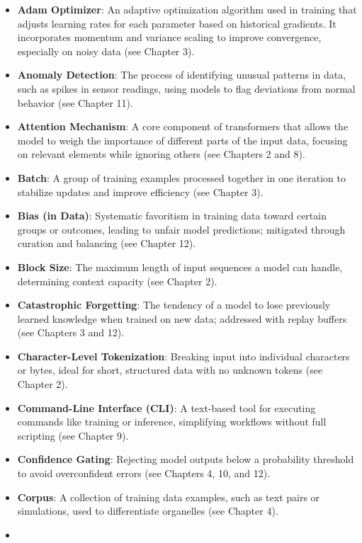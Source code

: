 \documentclass[
]{article}
\begin{document}
\begin{itemize}
\item
  \textbf{Adam Optimizer}: An adaptive optimization algorithm used in
  training that adjusts learning rates for each parameter based on
  historical gradients. It incorporates momentum and variance scaling to
  improve convergence, especially on noisy data (see Chapter 3).
\item
  \textbf{Anomaly Detection}: The process of identifying unusual
  patterns in data, such as spikes in sensor readings, using models to
  flag deviations from normal behavior (see Chapter 11).
\item
  \textbf{Attention Mechanism}: A core component of transformers that
  allows the model to weigh the importance of different parts of the
  input data, focusing on relevant elements while ignoring others (see
  Chapters 2 and 8).
\item
  \textbf{Batch}: A group of training examples processed together in one
  iteration to stabilize updates and improve efficiency (see Chapter 3).
\item
  \textbf{Bias (in Data)}: Systematic favoritism in training data toward
  certain groups or outcomes, leading to unfair model predictions;
  mitigated through curation and balancing (see Chapter 12).
\item
  \textbf{Block Size}: The maximum length of input sequences a model can
  handle, determining context capacity (see Chapter 2).
\item
  \textbf{Catastrophic Forgetting}: The tendency of a model to lose
  previously learned knowledge when trained on new data; addressed with
  replay buffers (see Chapters 3 and 12).
\item
  \textbf{Character-Level Tokenization}: Breaking input into individual
  characters or bytes, ideal for short, structured data with no unknown
  tokens (see Chapter 2).
\item
  \textbf{Command-Line Interface (CLI)}: A text-based tool for executing
  commands like training or inference, simplifying workflows without
  full scripting (see Chapter 9).
\item
  \textbf{Confidence Gating}: Rejecting model outputs below a
  probability threshold to avoid overconfident errors (see Chapters 4,
  10, and 12).
\item
  \textbf{Corpus}: A collection of training data examples, such as text
  pairs or simulations, used to differentiate organelles (see Chapter
  4).
\item

\end{itemize}
\end{document}
